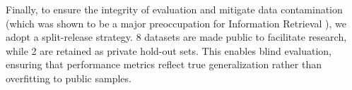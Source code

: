 Finally, to ensure the integrity of evaluation and mitigate data contamination (which was shown to be a major preoccupation for Information Retrieval ), we adopt a split-release strategy. 8 datasets are made public to facilitate research, while 2 are retained as private hold-out sets. This enables blind evaluation, ensuring that performance metrics reflect true generalization rather than overfitting to public samples.






